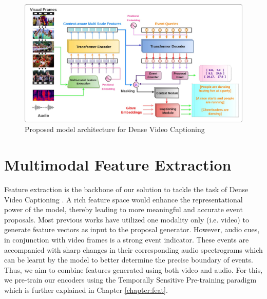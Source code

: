 \begin{figure} [H]
	\centering
	\includegraphics[width=\linewidth]{assets/img/architecture-no-bg.jpg}
	\caption{Proposed model architecture for Dense Video Captioning} %
\end{figure}

\section{Multimodal Feature Extraction}
\par Feature extraction is the backbone of our solution to tackle the task of Dense Video Captioning \cite{krishna2017densecaptioning}. A rich feature space would enhance the representational power of the model, thereby leading to more meaningful and accurate event proposals. Most previous works have utilized one modality only (i.e. video) to generate feature vectors as input to the proposal generator. However, audio cues, in conjunction with video frames is a strong event indicator. These events are accompanied with sharp changes in their corresponding audio spectrograms which can be learnt by the model to better determine the precise boundary of events. Thus, we aim to combine features generated using both video and audio. For this, we pre-train our encoders using the Temporally Sensitive Pre-training \cite{alwassel2021tsp} paradigm which is further explained in Chapter \ref{chapter:feat}.


